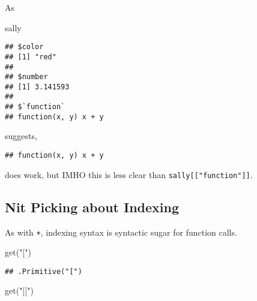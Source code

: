 \documentclass[
]{article}
\newenvironment{Shaded}{\begin{snugshade}}{\end{snugshade}}
\newcommand{\AttributeTok}[1]{\textcolor[rgb]{0.77,0.63,0.00}{#1}}
\newcommand{\FunctionTok}[1]{\textcolor[rgb]{0.00,0.00,0.00}{#1}}
\newcommand{\NormalTok}[1]{#1}
\newcommand{\SpecialCharTok}[1]{\textcolor[rgb]{0.00,0.00,0.00}{#1}}
\newcommand{\StringTok}[1]{\textcolor[rgb]{0.31,0.60,0.02}{#1}}
\begin{document}
\pagebreak[3]

As

\begin{Shaded}
\begin{Highlighting}[]
\NormalTok{sally}
\end{Highlighting}
\end{Shaded}

\begin{verbatim}
## $color
## [1] "red"
## 
## $number
## [1] 3.141593
## 
## $`function`
## function(x, y) x + y
\end{verbatim}

suggests,

\begin{Shaded}
\end{Shaded}

\begin{verbatim}
## function(x, y) x + y
\end{verbatim}

does work, but IMHO this is less clear than
\texttt{sally{[}{[}"function"{]}{]}}.

\hypertarget{nit-picking-about-indexing}{%
\subsection{Nit Picking about
Indexing}\label{nit-picking-about-indexing}}

As with \texttt{+}, indexing syntax is syntactic sugar for function
calls.

\begin{Shaded}
\begin{Highlighting}[]
\FunctionTok{get}\NormalTok{(}\StringTok{"["}\NormalTok{)}
\end{Highlighting}
\end{Shaded}

\begin{verbatim}
## .Primitive("[")
\end{verbatim}

\begin{Shaded}
\begin{Highlighting}[]
\FunctionTok{get}\NormalTok{(}\StringTok{"[["}\NormalTok{)}
\end{Highlighting}
\end{Shaded}
\end{document}
